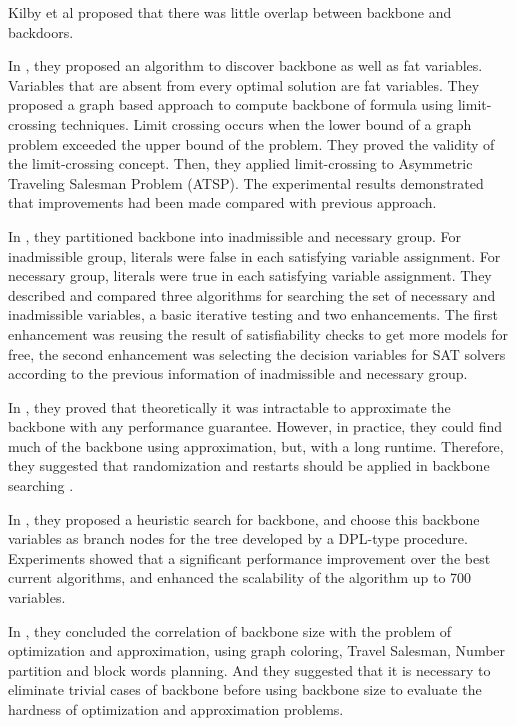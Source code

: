 Kilby et al proposed \cite{KST2005} that there was little overlap between backbone and backdoors.

In \cite{CZW2002}, they proposed an algorithm to discover backbone as well as fat variables. Variables that are absent from every optimal solution are fat variables. They proposed a graph based approach to compute backbone of formula using limit-crossing techniques. Limit crossing occurs when the lower bound of a graph problem exceeded the upper bound of the problem. They proved the validity of the limit-crossing concept. Then, they applied limit-crossing to Asymmetric Traveling Salesman Problem (ATSP). The experimental results demonstrated that improvements had been made compared with previous approach.

In \cite{KKW2001}, they partitioned backbone into inadmissible and necessary group. For inadmissible group, literals were false in each satisfying variable assignment. For necessary group, literals were true in each satisfying variable assignment. They described and compared three algorithms for searching the set of necessary and inadmissible variables, a basic iterative testing and two enhancements. The first enhancement was reusing the result of satisfiability checks to get more models for free, the second enhancement was selecting the decision variables for SAT solvers according to the previous information of inadmissible and necessary group.

In \cite{KSW2005}, they proved that theoretically it was intractable to approximate the backbone with any performance guarantee.
However, in practice, they could find much of the backbone using approximation, but, with a long runtime. Therefore, they suggested that randomization and restarts should be applied in backbone searching .

In \cite{DD2001}, they proposed a heuristic search for backbone, and choose this backbone variables as branch nodes for the tree developed by a DPL-type procedure. Experiments showed that a significant performance improvement over the best current algorithms, and enhanced the scalability of the algorithm up to 700 variables.

In \cite{WS2001}, they concluded the correlation of backbone size with the problem of optimization and approximation, using graph coloring, Travel Salesman, Number partition and block words planning. And they suggested that it is necessary to eliminate trivial cases of backbone before using backbone size to evaluate the hardness of optimization and approximation problems.

